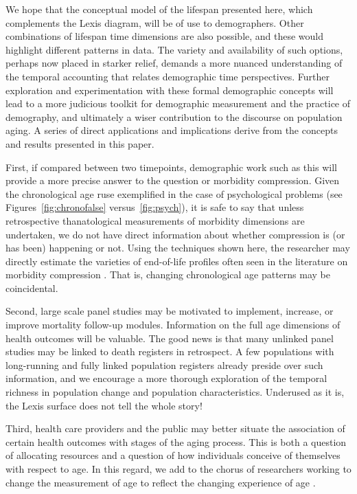 \documentclass[11pt,oneside]{article} %
\begin{document}
We hope that the conceptual model of the
lifespan presented here, which complements the Lexis diagram, will be of use to
demographers. Other combinations of lifespan time dimensions are also possible,
and these would highlight different patterns in data. The variety and
availability of such options, perhaps now placed in starker relief, demands a more nuanced
understanding of the temporal accounting that relates demographic time
perspectives. Further exploration and experimentation with these formal
demographic concepts will lead to a more judicious toolkit for demographic
measurement and the practice of demography, and ultimately a wiser contribution
to the discourse on population aging. A series of direct applications and
implications derive from the concepts and results presented in this paper. 

First, if
compared between two timepoints, demographic work such as this will
provide a more precise answer to the question or morbidity compression. Given the chronological age ruse exemplified in the case of psychological problems (see Figures~\ref{fig:chronofalse} versus~\ref{fig:psych}), it is safe to say that unless retrospective
thanatological measurements of morbidity dimensions are undertaken, we do
not have direct information about whether compression is (or has
been) happening or not. Using the techniques shown here, the researcher may
directly estimate the varieties of end-of-life profiles often seen in the
literature on morbidity compression \citep[e.g.,][]{fries2011compression}. That
is, changing chronological age patterns may be coincidental.

Second, large scale panel studies may be motivated to
implement, increase, or improve mortality follow-up modules. Information
on the full age dimensions of health outcomes will be valuable. The good news is
that many unlinked panel studies may be linked to death registers in
retrospect. A few populations with long-running and fully linked
population registers already preside over such information, and we encourage a
more thorough exploration of the temporal richness in population change and
population characteristics. Underused as it is, the Lexis surface does not tell
the whole story! 

Third, health care providers and the public may better situate the association
of certain health outcomes with stages of the aging process. This is both a
question of allocating resources and a question of how individuals conceive of
themselves with respect to age. In this regard, we add to the chorus of
researchers working to change the measurement of age to reflect the changing
experience of age \citep[see e.g.,][]{sanderson2013characteristics}. 
\end{document}
